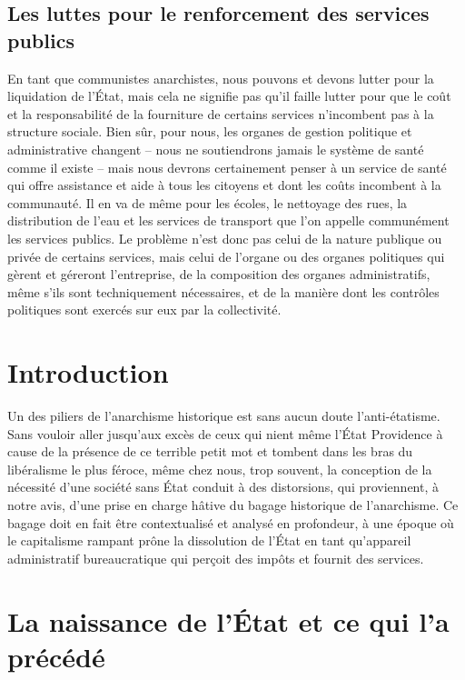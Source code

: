 \section*{Les luttes pour le renforcement des services publics}

En tant que communistes anarchistes, nous pouvons et devons lutter pour la liquidation de l'État, mais cela ne signifie pas qu'il faille lutter pour que le coût et la responsabilité de la fourniture de certains services n'incombent pas à la structure sociale. Bien sûr, pour nous, les organes de gestion politique et administrative changent – nous ne soutiendrons jamais le système de santé comme il existe – mais nous devrons certainement penser à un service de santé qui offre assistance et aide à tous les citoyens et dont les coûts incombent à la communauté. Il en va de même pour les écoles, le nettoyage des rues, la distribution de l'eau et les services de transport que l'on appelle communément les services publics. Le problème n'est donc pas celui de la nature publique ou privée de certains services, mais celui de l'organe ou des organes politiques qui gèrent et géreront l'entreprise, de la composition des organes administratifs, même s'ils sont techniquement nécessaires, et de la manière dont les contrôles politiques sont exercés sur eux par la collectivité.

\chapter{Introduction}

Un des piliers de l'anarchisme historique est sans aucun doute l'anti-étatisme. Sans vouloir aller jusqu'aux excès de ceux qui nient même l'État Providence à cause de la présence de ce terrible petit mot et tombent dans les bras du libéralisme le plus féroce, même chez nous, trop souvent, la conception de la nécessité d'une société sans État conduit à des distorsions, qui proviennent, à notre avis, d'une prise en charge hâtive du bagage historique de l'anarchisme. Ce bagage doit en fait être contextualisé et analysé en profondeur, à une époque où le capitalisme rampant prône la dissolution de l'État en tant qu'appareil administratif bureaucratique qui perçoit des impôts et fournit des services.

\mainmatter
\chapter{La naissance de l'État et ce qui l'a précédé}

